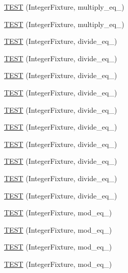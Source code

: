\begin{DoxyCompactItemize}
\item 
\hyperlink{TestInteger_8c_09_09_a18ea07e9c4bd1dea7eba2241c15c9e8f}{T\-E\-S\-T} (Integer\-Fixture, multiply\-\_\-eq\-\_)
\item 
\hyperlink{TestInteger_8c_09_09_a89fd93c40e3fb7d5df2a18d0fc115fb9}{T\-E\-S\-T} (Integer\-Fixture, multiply\-\_\-eq\-\_)
\item 
\hyperlink{TestInteger_8c_09_09_aa84e342419dd3b51f50a30b9c8b4f943}{T\-E\-S\-T} (Integer\-Fixture, divide\-\_\-eq\-\_)
\item 
\hyperlink{TestInteger_8c_09_09_a88d44d1e4fd05ad2f2069842dfce473c}{T\-E\-S\-T} (Integer\-Fixture, divide\-\_\-eq\-\_)
\item 
\hyperlink{TestInteger_8c_09_09_a0854e3ab5676d6e71b2e453e6ceb531c}{T\-E\-S\-T} (Integer\-Fixture, divide\-\_\-eq\-\_)
\item 
\hyperlink{TestInteger_8c_09_09_ae3f6134489a77320d26c416a0e849d17}{T\-E\-S\-T} (Integer\-Fixture, divide\-\_\-eq\-\_)
\item 
\hyperlink{TestInteger_8c_09_09_afcb4231755a713d10e2b6247c3c28142}{T\-E\-S\-T} (Integer\-Fixture, divide\-\_\-eq\-\_)
\item 
\hyperlink{TestInteger_8c_09_09_a1fe0f933907d750a828d469cbfb0deb9}{T\-E\-S\-T} (Integer\-Fixture, divide\-\_\-eq\-\_)
\item 
\hyperlink{TestInteger_8c_09_09_a8889b9852f7173c5bd5ec9b3c439572a}{T\-E\-S\-T} (Integer\-Fixture, divide\-\_\-eq\-\_)
\item 
\hyperlink{TestInteger_8c_09_09_acad0a0dec52da4596ac37946a05fde94}{T\-E\-S\-T} (Integer\-Fixture, divide\-\_\-eq\-\_)
\item 
\hyperlink{TestInteger_8c_09_09_aa38d4709eb5d7e4a0ce17eda1fa9eefc}{T\-E\-S\-T} (Integer\-Fixture, divide\-\_\-eq\-\_)
\item 
\hyperlink{TestInteger_8c_09_09_ab8956531d8b8db32543365ed6130a346}{T\-E\-S\-T} (Integer\-Fixture, divide\-\_\-eq\-\_)
\item 
\hyperlink{TestInteger_8c_09_09_a2d0d450c3bd57d8dbca9f8b966f67f23}{T\-E\-S\-T} (Integer\-Fixture, mod\-\_\-eq\-\_)
\item 
\hyperlink{TestInteger_8c_09_09_a065d36a238f73dc5d4817c43f1a36faa}{T\-E\-S\-T} (Integer\-Fixture, mod\-\_\-eq\-\_)
\item 
\hyperlink{TestInteger_8c_09_09_a2b247cc4cdba949c5ec29de237420298}{T\-E\-S\-T} (Integer\-Fixture, mod\-\_\-eq\-\_)
\item 
\hyperlink{TestInteger_8c_09_09_a4a8d1cad78f383e97a565a9f8949c5e8}{T\-E\-S\-T} (Integer\-Fixture, mod\-\_\-eq\-\_)

\end{DoxyCompactItemize}
